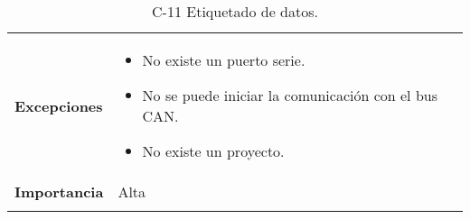\begin{longtable}[H]{@{}ll@{}}
\begin{minipage}[t]{0.23\columnwidth}\raggedright\strut
\textbf{Excepciones}\strut
\end{minipage} & \begin{minipage}[t]{0.71\columnwidth}\raggedright\strut
\begin{itemize}
\item
No existe un puerto serie.
\item
No se puede iniciar la comunicación con el bus CAN.
\item
No existe un proyecto.
\end{itemize}\strut
\end{minipage}\tabularnewline
\begin{minipage}[t]{0.23\columnwidth}\raggedright\strut
\textbf{Importancia}\strut
\end{minipage} & \begin{minipage}[t]{0.71\columnwidth}\raggedright\strut
Alta\strut
\end{minipage}\tabularnewline
\bottomrule
\caption{C-11 Etiquetado de datos.}
\end{longtable}


